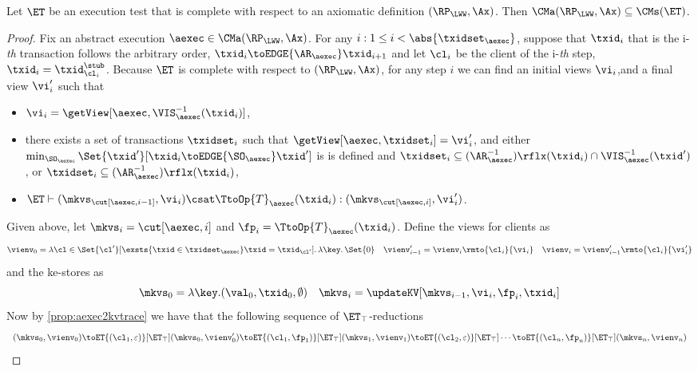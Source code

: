 \begin{theorem}
\label{thm:et_complete}
Let \(\ET\) be an execution test that is complete with respect to an axiomatic definition \((\RP_{\LWW}, \Ax)\). 
Then \(\CMa(\RP_{\LWW}, \Ax) \subseteq \CMs(\ET)\).
\end{theorem}
\begin{proof}
Fix an abstract execution \(\aexec \in \CMa(\RP_{\LWW}, \Ax)\). 
For any \(i : 1 \leq i < \abs{\txidset_\aexec} \), suppose that \( \txid_i \) that is the i-\emph{th} transaction follows the arbitrary order, \ie \(\txid_{i} \toEDGE{\AR_{\aexec}} \txid_{i+1}\) 
and let \(\cl_{i}\) be the client of the i-\emph{th} step, \ie \(\txid_{i} = \txid_{\cl_{i}}^{\stub}\).
Because \(\ET\) is complete with respect to \((\RP_{\LWW}, \Ax)\), 
for any step \(i\) we can find an initial views \(\vi_i\),and a final view \(\vi'_{i}\) such that 
\begin{itemize}
\item \(\vi_i = \getView[\aexec, \VIS^{-1}_{\aexec}(\txid_{i})]\), 
\item there exists a set of transactions \(\txidset_{i}\) such that \(\getView[\aexec, \txidset_{i}] = \vi'_{i}\), and 
either \(\min_{\SO_{\aexec}}\Set{\txid' }[ \txid_{i} \toEDGE{\SO_{\aexec}} \txid']\) is 
is defined and \(\txidset_{i} \subseteq (\AR_{\aexec}^{-1})\rflx(\txid_{i}) \cap \VIS^{-1}_{\aexec}(\txid')\), 
or \(\txidset_{i} \subseteq (\AR_{\aexec}^{-1})\rflx(\txid_{i})\), 
\item \(\ET \vdash (\mkvs_{\cut[\aexec, i-1]}, \vi_i) \csat \TtoOp{T}_{\aexec}(\txid_{i}): (\mkvs_{\cut[\aexec, i]}, \vi'_{i})\).
\end{itemize}
Given above, let \(\mkvs_{i} = \cut[\aexec, i]\) and \(\fp_{i} = \TtoOp{T}_{\aexec}(\txid_{i})\). Define the views for clients as 
\[
\vienv_{0} = \lambda \cl \in \Set{\cl' }[ \exsts{ \txid \in \txidset_{\aexec} } \txid = \txid_{\cl'}] \ldotp \lambda \key \ldotp \Set{0}
\quad \vienv'_{i-1} = \vienv_{i}\rmto{\cl_{i}}{ \vi_i}
\quad \vienv_{i} = \vienv'_{i-1}\rmto{\cl_{i} }{\vi'_{i}}
\]
and the ke-stores as
\[
\mkvs_{0} = \lambda \key.(\val_{0}, \txid_{0}, \emptyset)
\quad \mkvs_{i} = \updateKV[\mkvs_{i-1}, \vi_i, \fp_{i}, \txid_{i}]
\]
Now by \cref{prop:aexec2kvtrace} we have that the following sequence of \(\ET_{\top}\)-reductions 
\[
\begin{array}{l}
(\mkvs_{0}, \vienv_{0}) \toET{(\cl_{1}, \varepsilon)}[\ET_{\top}] (\mkvs_{0}, \vienv'_{0}) 
\toET{(\cl_{1}, \fp_{1})}[\ET_{\top}] (\mkvs_{1}, \vienv_{1}) 
\toET{(\cl_{2}, \varepsilon)}[\ET_{\top}]
\cdots \toET{(\cl_{n}, \fp_{n})}[\ET_{\top}] (\mkvs_{n}, \vienv_{n})

\end{array}\]
\end{proof}
